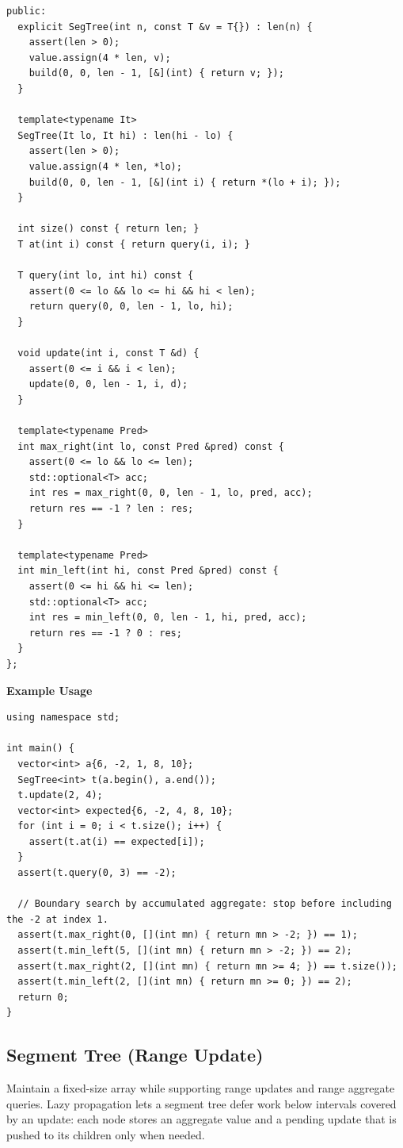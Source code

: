 \begin{lstlisting}[style=cpp]
 public:
  explicit SegTree(int n, const T &v = T{}) : len(n) {
    assert(len > 0);
    value.assign(4 * len, v);
    build(0, 0, len - 1, [&](int) { return v; });
  }

  template<typename It>
  SegTree(It lo, It hi) : len(hi - lo) {
    assert(len > 0);
    value.assign(4 * len, *lo);
    build(0, 0, len - 1, [&](int i) { return *(lo + i); });
  }

  int size() const { return len; }
  T at(int i) const { return query(i, i); }

  T query(int lo, int hi) const {
    assert(0 <= lo && lo <= hi && hi < len);
    return query(0, 0, len - 1, lo, hi);
  }

  void update(int i, const T &d) {
    assert(0 <= i && i < len);
    update(0, 0, len - 1, i, d);
  }

  template<typename Pred>
  int max_right(int lo, const Pred &pred) const {
    assert(0 <= lo && lo <= len);
    std::optional<T> acc;
    int res = max_right(0, 0, len - 1, lo, pred, acc);
    return res == -1 ? len : res;
  }

  template<typename Pred>
  int min_left(int hi, const Pred &pred) const {
    assert(0 <= hi && hi <= len);
    std::optional<T> acc;
    int res = min_left(0, 0, len - 1, hi, pred, acc);
    return res == -1 ? 0 : res;
  }
};
\end{lstlisting}
\textbf{Example Usage}\par
\begin{lstlisting}[style=cpp]
using namespace std;

int main() {
  vector<int> a{6, -2, 1, 8, 10};
  SegTree<int> t(a.begin(), a.end());
  t.update(2, 4);
  vector<int> expected{6, -2, 4, 8, 10};
  for (int i = 0; i < t.size(); i++) {
    assert(t.at(i) == expected[i]);
  }
  assert(t.query(0, 3) == -2);

  // Boundary search by accumulated aggregate: stop before including the -2 at index 1.
  assert(t.max_right(0, [](int mn) { return mn > -2; }) == 1);
  assert(t.min_left(5, [](int mn) { return mn > -2; }) == 2);
  assert(t.max_right(2, [](int mn) { return mn >= 4; }) == t.size());
  assert(t.min_left(2, [](int mn) { return mn >= 0; }) == 2);
  return 0;
}
\end{lstlisting}
\subsection{Segment Tree (Range Update)}
\label{sec:2.5.6}
Maintain a fixed-size array while supporting range updates and range aggregate queries. Lazy propagation lets a segment tree defer work below intervals covered by an update: each node stores an aggregate value and a pending update that is pushed to its children only when needed.

